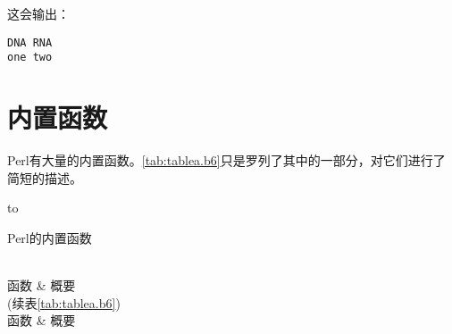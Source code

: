 这会输出：

\begin{lstlisting}
DNA RNA
one two
\end{lstlisting}

\section{内置函数}
Perl有大量的内置函数。\autoref{tab:tablea.b6}只是罗列了其中的一部分，对它们进行了简短的描述。

\setlength{\tabulinesep}{0.5em}
\begin{longtabu*} to \linewidth {X[3.6,l,m]X[5,l,m]}
  \caption{Perl的内置函数}
  \label{tab:tablea.b6}\\
      \toprule
      函数 & 概要\\
      \midrule
      \endfirsthead
      (续表\ref{tab:tablea.b6})\\
      \toprule
      函数 & 概要\\
      \midrule
      \endhead
      \midrule
      \\
      \endfoot
      \bottomrule
      \endlastfoot


\end{longtabu*}
